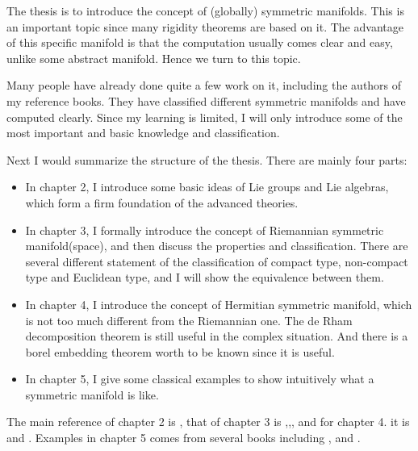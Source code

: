 \hspace*{1em}
The thesis is to introduce the concept of (globally) symmetric manifolds. This is an important topic since many rigidity theorems are based on it. The advantage of this specific manifold is that the computation usually comes clear and easy, unlike some abstract manifold. Hence we turn to this topic.

Many people have already done quite a few work on it, including the authors of my reference books. They have classified different symmetric manifolds and have computed clearly. Since my learning is limited, I will only introduce some of the most important and basic knowledge and classification.

Next I would summarize the structure of the thesis. There are mainly four parts:
\begin{itemize}
    \item In chapter 2, I introduce some basic ideas of Lie groups and Lie algebras, which form a firm foundation of the advanced theories.
    \item In chapter 3, I formally introduce the concept of Riemannian symmetric manifold(space), and then discuss the properties and classification. There are several different statement of the classification of compact type, non-compact type and Euclidean type, and I will show the equivalence between them.
    \item In chapter 4, I introduce the concept of Hermitian symmetric manifold, which is not too much different from the Riemannian one. The de Rham decomposition theorem is still useful in the complex situation. And there is a borel embedding theorem worth to be known since it is useful.
    \item In chapter 5, I give some classical examples to show intuitively what a symmetric manifold is like.
\end{itemize}
The main reference of chapter 2 is \cite{Hel}, that of chapter 3 is \cite{Hel},\cite{Ziller},\cite{Besse}, and for chapter 4. it is \cite{Mok} and \cite{Ziller}. Examples in chapter 5 comes from several books including \cite{Peter},\cite{Ziller} and \cite{MR1451625}.











	 
	